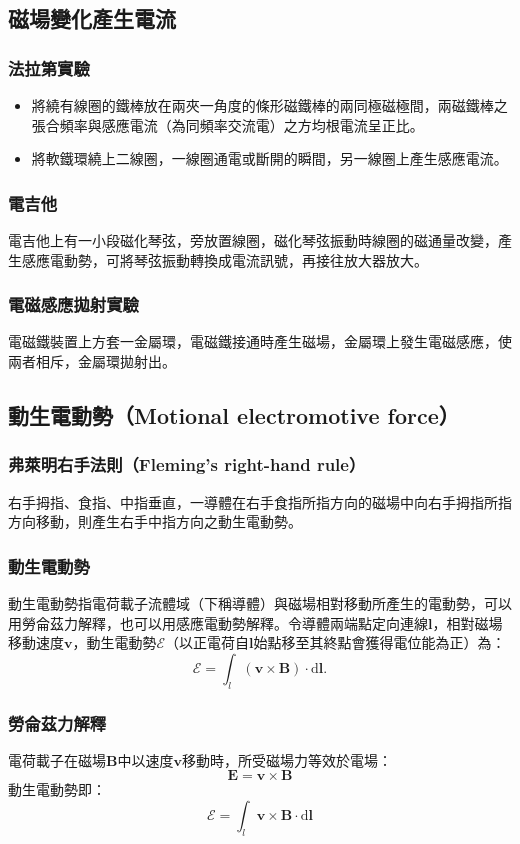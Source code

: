 \documentclass[a4paper,12pt]{report}
\begin{document}
\begin{itemize}
\subsection{磁場變化產生電流}
\subsubsection{法拉第實驗}
\begin{itemize}
\item 將繞有線圈的鐵棒放在兩夾一角度的條形磁鐵棒的兩同極磁極間，兩磁鐵棒之張合頻率與感應電流（為同頻率交流電）之方均根電流呈正比。
\item 將軟鐵環繞上二線圈，一線圈通電或斷開的瞬間，另一線圈上產生感應電流。
\end{itemize}
\subsubsection{電吉他}
電吉他上有一小段磁化琴弦，旁放置線圈，磁化琴弦振動時線圈的磁通量改變，產生感應電動勢，可將琴弦振動轉換成電流訊號，再接往放大器放大。
\subsubsection{電磁感應拋射實驗}
電磁鐵裝置上方套一金屬環，電磁鐵接通時產生磁場，金屬環上發生電磁感應，使兩者相斥，金屬環拋射出。
\subsection{動生電動勢（Motional electromotive force）}
\subsubsection{弗萊明右手法則（Fleming's right-hand rule）}
右手拇指、食指、中指垂直，一導體在右手食指所指方向的磁場中向右手拇指所指方向移動，則產生右手中指方向之動生電動勢。
\subsubsection{動生電動勢}
動生電動勢指電荷載子流體域（下稱導體）與磁場相對移動所產生的電動勢，可以用勞侖茲力解釋，也可以用感應電動勢解釋。令導體兩端點定向連線$\mathbf{l}$，相對磁場移動速度$\mathbf{v}$，動生電動勢$\mathcal{E}$（以正電荷自$\mathbf{l}$始點移至其終點會獲得電位能為正）為：
\[\mathcal{E}=\int_{l}\left(\mathbf{v}\times\mathbf{B}\right)\cdot\mathrm{d}\mathbf{l}.\]
\subsubsection{勞侖茲力解釋}
電荷載子在磁場$\mathbf{B}$中以速度$\mathbf{v}$移動時，所受磁場力等效於電場：
\[\mathbf{E}=\mathbf{v}\times\mathbf{B}\]
動生電動勢即：
\[\mathcal{E}=\int_l\mathbf{v}\times\mathbf{B}\cdot\mathrm{d}\mathbf{l}\]

\end{itemize}
\end{document}
